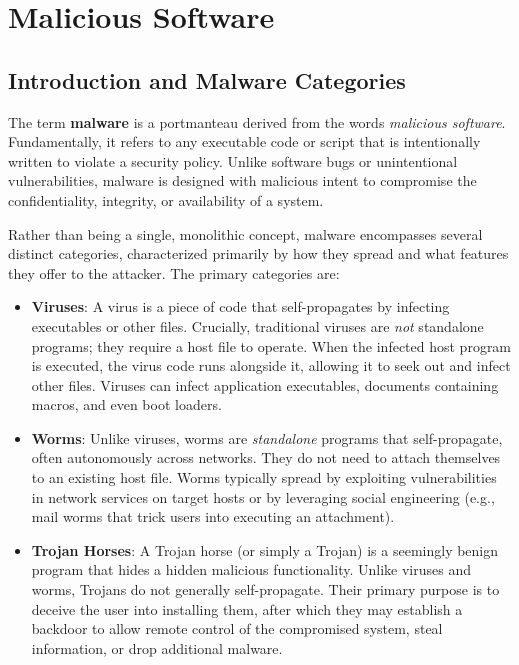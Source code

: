 \chapter{Malicious Software}
\label{ch:malicious_software}

\section{Introduction and Malware Categories}
The term \textbf{malware} is a portmanteau derived from the words \textit{malicious software}. Fundamentally, it refers to any executable code or script that is intentionally written to violate a security policy. Unlike software bugs or unintentional vulnerabilities, malware is designed with malicious intent to compromise the confidentiality, integrity, or availability of a system.

Rather than being a single, monolithic concept, malware encompasses several distinct categories, characterized primarily by how they spread and what features they offer to the attacker. The primary categories are:

\begin{itemize}
    \item \textbf{Viruses}: A virus is a piece of code that self-propagates by infecting executables or other files. Crucially, traditional viruses are \textit{not} standalone programs; they require a host file to operate. When the infected host program is executed, the virus code runs alongside it, allowing it to seek out and infect other files. Viruses can infect application executables, documents containing macros, and even boot loaders.
    \item \textbf{Worms}: Unlike viruses, worms are \textit{standalone} programs that self-propagate, often autonomously across networks. They do not need to attach themselves to an existing host file. Worms typically spread by exploiting vulnerabilities in network services on target hosts or by leveraging social engineering (e.g., mail worms that trick users into executing an attachment).
    \item \textbf{Trojan Horses}: A Trojan horse (or simply a Trojan) is a seemingly benign program that hides a hidden malicious functionality. Unlike viruses and worms, Trojans do not generally self-propagate. Their primary purpose is to deceive the user into installing them, after which they may establish a backdoor to allow remote control of the compromised system, steal information, or drop additional malware.
\end{itemize}

